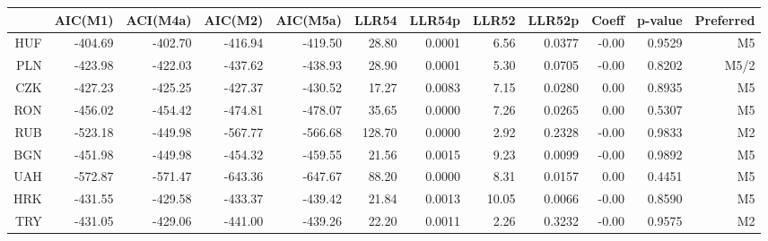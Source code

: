 \documentclass[12pt, a4paper, oneside]{article}\usepackage[]{graphicx}\usepackage[]{color}
\begin{document}
\begin{sidewaystable}[p]
\begin{threeparttable}
\centering
\begin{tabular}{rrrrrrrrrrrr}
  \hline
 & AIC(M1) & ACI(M4a) & AIC(M2) & AIC(M5a) & LLR54 & LLR54p & LLR52 & LLR52p & Coeff & p-value & Preferred\\ 
  \hline
HUF & -404.69 & -402.70 & -416.94 & -419.50 & 28.80 & 0.0001 & 6.56 & 0.0377 & -0.00 & 0.9529 & M5\\ 
  PLN & -423.98 & -422.03 & -437.62 & -438.93 & 28.90 & 0.0001 & 5.30 & 0.0705 & -0.00 & 0.8202 & M5/2\\ 
  CZK & -427.23 & -425.25 & -427.37 & -430.52 & 17.27 & 0.0083 & 7.15 & 0.0280 & 0.00 & 0.8935 & M5\\ 
  RON & -456.02 & -454.42 & -474.81 & -478.07 & 35.65 & 0.0000 & 7.26 & 0.0265 & 0.00 & 0.5307 & M5\\ 
  RUB & -523.18 & -449.98 & -567.77 & -566.68 & 128.70 & 0.0000 & 2.92 & 0.2328 & -0.00 & 0.9833 & M2\\ 
  BGN & -451.98 & -449.98 & -454.32 & -459.55 & 21.56 & 0.0015 & 9.23 & 0.0099 & -0.00 & 0.9892 & M5\\ 
  UAH & -572.87 & -571.47 & -643.36 & -647.67 & 88.20 & 0.0000 & 8.31 & 0.0157 & 0.00 & 0.4451 & M5\\ 
  HRK & -431.55 & -429.58 & -433.37 & -439.42 & 21.84 & 0.0013 & 10.05 & 0.0066 & -0.00 & 0.8590 & M5\\ 
  TRY & -431.05 & -429.06 & -441.00 & -439.26 & 22.20 & 0.0011 & 2.26 & 0.3232 & -0.00 & 0.9575 & M2\\ 
   \hline
\end{tabular}
\begin{tablenotes}
\small

\end{tablenotes}
\end{threeparttable}
\end{sidewaystable}
\end{document}
